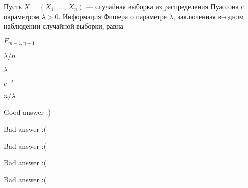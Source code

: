 
\begin{question}
Пусть \(X = (X_1, \, \ldots, \, X_n)\) --- случайная выборка из
распределения Пуассона с параметром \(\lambda > 0\). Информация Фишера о
параметре \(\lambda\), заключенная в\textasciitilde{}\textsc{одном}
наблюдении случайной выборки, равна
\begin{answerlist}
  \item \(F_{m-1,n-1}\)
  \item \(\lambda / n\)
  \item \(\lambda\)
  \item \(e^{-\lambda}\)
  \item \(n / \lambda\)
\end{answerlist}
\end{question}

\begin{solution}
\begin{answerlist}
  \item Good answer :)
  \item Bad answer :(
  \item Bad answer :(
  \item Bad answer :(
  \item Bad answer :(
\end{answerlist}
\end{solution}

